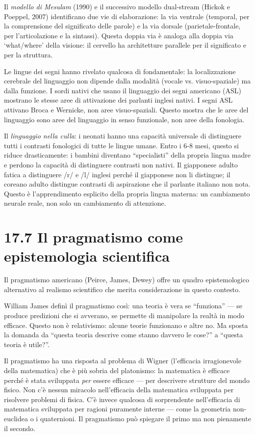 \documentclass[11.5pt,a4paper,openany]{book}
\theoremstyle{remark}
\begin{document}
Il \textit{modello di Mesulam} (1990) e il successivo modello dual-stream (Hickok e Poeppel, 2007) identificano due vie di elaborazione: la via ventrale (temporal, per la comprensione del significato delle parole) e la via dorsale (parietale-frontale, per l'articolazione e la sintassi). Questa doppia via è analoga alla doppia via `what/where' della visione: il cervello ha architetture parallele per il significato e per la struttura.

Le lingue dei segni hanno rivelato qualcosa di fondamentale: la localizzazione cerebrale del linguaggio non dipende dalla modalità (vocale vs. visuo-spaziale) ma dalla funzione. I sordi nativi che usano il linguaggio dei segni americano (ASL) mostrano le stesse aree di attivazione dei parlanti inglesi nativi. I segni ASL attivano Broca e Wernicke, non aree visuo-spaziali. Questo mostra che le aree del linguaggio sono aree del linguaggio in senso funzionale, non aree della fonologia.

Il \textit{linguaggio nella culla}: i neonati hanno una capacità universale di distinguere tutti i contrasti fonologici di tutte le lingue umane. Entro i 6-8 mesi, questo si riduce drasticamente: i bambini diventano ``specialisti'' della propria lingua madre e perdono la capacità di distinguere contrasti non nativi. Il giapponese adulto fatica a distinguere /r/ e /l/ inglesi perché il giapponese non li distingue; il coreano adulto distingue contrasti di aspirazione che il parlante italiano non nota. Questo è l'apprendimento esplicito della propria lingua materna: un cambiamento neurale reale, non solo un cambiamento di attenzione.

\section{17.7 Il pragmatismo come epistemologia scientifica}

Il pragmatismo americano (Peirce, James, Dewey) offre un quadro epistemologico alternativo al realismo scientifico che merita considerazione in questo contesto.

William James definì il pragmatismo così: una teoria è vera se ``funziona'' --- se produce predizioni che si avverano, se permette di manipolare la realtà in modo efficace. Questo non è relativismo: alcune teorie funzionano e altre no. Ma sposta la domanda da ``questa teoria descrive come stanno davvero le cose?'' a ``questa teoria è utile?''.

Il pragmatismo ha una risposta al problema di Wigner (l'efficacia irragionevole della matematica) che è più sobria del platonismo: la matematica è efficace perché è stata sviluppata \textit{per} essere efficace --- per descrivere strutture del mondo fisico. Non c'è nessun miracolo nell'efficacia della matematica sviluppata per risolvere problemi di fisica. C'è invece qualcosa di sorprendente nell'efficacia di matematica sviluppata per ragioni puramente interne --- come la geometria non-euclidea o i quaternioni. Il pragmatismo può spiegare il primo ma non pienamente il secondo.
\end{document}
